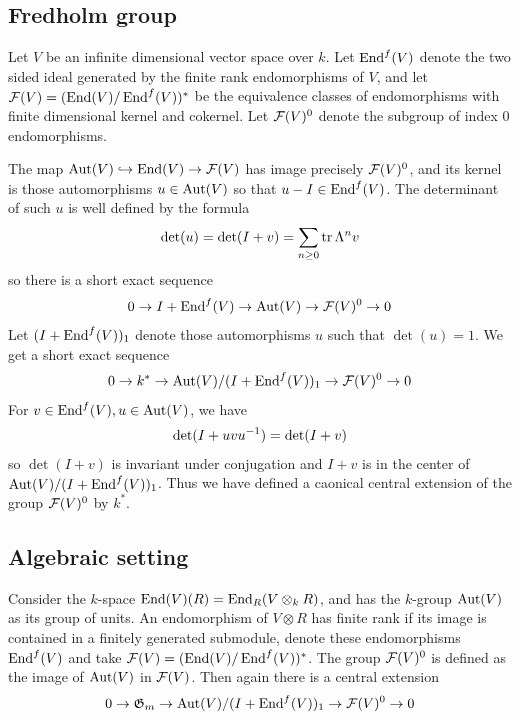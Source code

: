 \documentclass[12pt]{article}
\begin{document}
\subsection{Fredholm group}
Let $V$ be an infinite dimensional vector space over $k$. Let $\operatorname{End}^f(V)$ denote the two sided ideal generated by the finite rank endomorphisms of $V$, and let ${\mathcal{F}}(V) = (\operatorname{End}(V) / \operatorname{End}^f(V))^*$ be the equivalence classes of endomorphisms with finite dimensional kernel and cokernel. Let ${\mathcal{F}}(V)^0$ denote the subgroup of index $0$ endomorphisms.

The map $\operatorname{Aut}(V) \hookrightarrow \operatorname{End}(V) \to {\mathcal{F}}(V)$ has image precisely ${\mathcal{F}}(V)^0$, and its kernel is those automorphisms $u \in \operatorname{Aut}(V)$ so that $u - I \in \operatorname{End}^f(V)$.
The determinant of such $u$ is well defined by the formula \begin{align*}
    \det(u) = \det(I+v) = \sum_{n\geq 0} \operatorname{tr} \Lambda^n v
\end{align*}
so there is a short exact sequence \begin{align*}
    0 \to I + \operatorname{End}^f(V) \to \operatorname{Aut}(V) \to {\mathcal{F}}(V)^0 \to 0
\end{align*} Let $(I + \operatorname{End}^f(V))_1$ denote those automorphisms $u$ such that $\det(u) = 1$. We get a short exact sequence \begin{align*}
    0 \to k^* \to \operatorname{Aut}(V)/(I + \operatorname{End}^f(V))_1 \to {\mathcal{F}}(V)^0 \to 0
\end{align*} For $v\in \operatorname{End}^f(V), u\in \operatorname{Aut}(V)$, we have \begin{align*}
    \det(I + uv{u}^{-1}) = \det(I + v)
\end{align*} so $\det(I+v)$ is invariant under conjugation and $I+v$ is in the center of $\operatorname{Aut}(V)/(I + \operatorname{End}^f(V))_1$. Thus we have defined a caonical central extension of the group ${\mathcal{F}}(V)^0$ by $k^*$.

\subsection{Algebraic setting}
Consider the $k$-space $\operatorname{End}(V)(R) = \operatorname{End}_R(V\otimes_k R)$, and has the $k$-group $\operatorname{Aut}(V)$ as its group of units. An endomorphism of $V\otimes R$ has finite rank if its image is contained in a finitely generated submodule, denote these endomorphisms $\operatorname{End}^f(V)$ and take ${\mathcal{F}}(V) = (\operatorname{End}(V) / \operatorname{End}^f(V))^*$. The group ${\mathcal{F}}(V)^0$ is defined as the image of $\operatorname{Aut}(V)$ in ${\mathcal{F}}(V)$. Then again there is a central extension \begin{align*}
    0 \to \mathfrak{G}_m \to \operatorname{Aut}(V)/(I + \operatorname{End}^f(V))_1 \to {\mathcal{F}}(V)^0 \to 0
\end{align*}
\end{document}
